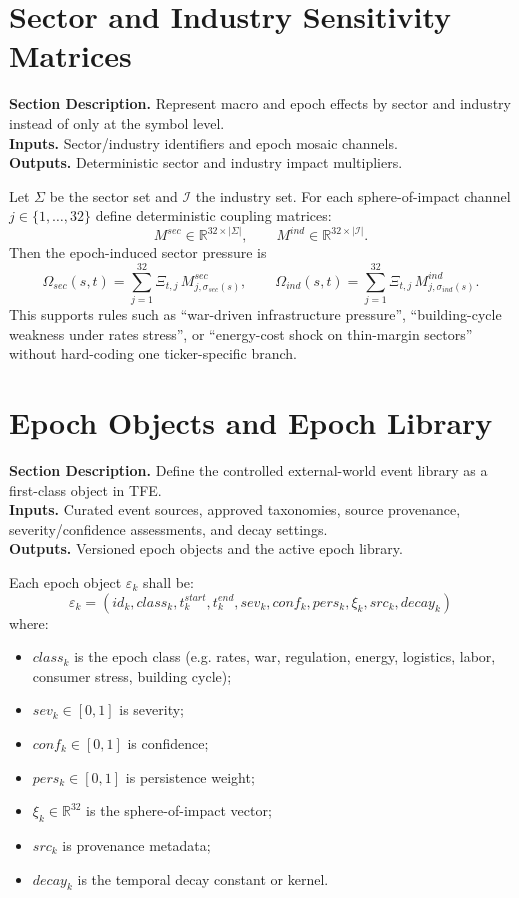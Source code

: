 \documentclass[11pt]{report}
\newcommand{\meta}[3]{\textbf{Section Description.} #1\\
\textbf{Inputs.} #2\\
\textbf{Outputs.} #3\par}
\begin{document}
\section{Sector and Industry Sensitivity Matrices}
\meta{Represent macro and epoch effects by sector and industry instead of only at the symbol level.}{Sector/industry identifiers and epoch mosaic channels.}{Deterministic sector and industry impact multipliers.}

Let $\Sigma$ be the sector set and $\mathcal{I}$ the industry set. For each sphere-of-impact channel $j\in\{1,\dots,32\}$ define deterministic coupling matrices:
\[
M^{sec}\in\mathbb{R}^{32\times |\Sigma|},\qquad M^{ind}\in\mathbb{R}^{32\times |\mathcal{I}|}.
\]
Then the epoch-induced sector pressure is
\[
\Omega_{sec}(s,t)=\sum_{j=1}^{32}\Xi_{t,j}\,M^{sec}_{j,\sigma_{sec}(s)},
\qquad
\Omega_{ind}(s,t)=\sum_{j=1}^{32}\Xi_{t,j}\,M^{ind}_{j,\sigma_{ind}(s)}.
\]
This supports rules such as ``war-driven infrastructure pressure'', ``building-cycle weakness under rates stress'', or ``energy-cost shock on thin-margin sectors'' without hard-coding one ticker-specific branch.

\section{Epoch Objects and Epoch Library}
\meta{Define the controlled external-world event library as a first-class object in TFE.}{Curated event sources, approved taxonomies, source provenance, severity/confidence assessments, and decay settings.}{Versioned epoch objects and the active epoch library.}

Each epoch object $\varepsilon_k$ shall be:
\[
\varepsilon_k = (id_k,class_k,t_k^{start},t_k^{end},sev_k,conf_k,pers_k,\xi_k,src_k,decay_k)
\]
where:
\begin{itemize}
\item $class_k$ is the epoch class (e.g. rates, war, regulation, energy, logistics, labor, consumer stress, building cycle);
\item $sev_k\in[0,1]$ is severity;
\item $conf_k\in[0,1]$ is confidence;
\item $pers_k\in[0,1]$ is persistence weight;
\item $\xi_k\in\mathbb{R}^{32}$ is the sphere-of-impact vector;
\item $src_k$ is provenance metadata;
\item $decay_k$ is the temporal decay constant or kernel.
\end{itemize}
\end{document}
